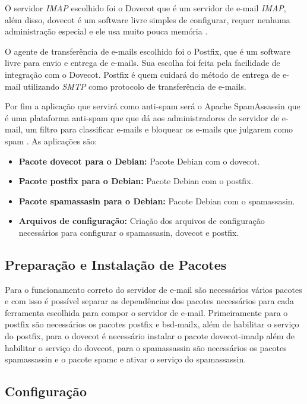 O servidor \textit{IMAP} escolhido foi o Dovecot que é um servidor de e-mail
\textit{IMAP}, além disso, dovecot é um software livre simples de configurar, requer nenhuma
administração especial e ele usa muito pouca memória \cite{dovecot}. 

O agente de transferência de e-mails escolhido foi o Postfix, que é um software
livre para envio e entrega de e-mails. Sua escolha foi feita pela facilidade de
integração com o Dovecot. Postfix é quem cuidará do método de entrega de e-mail
utilizando \textit{SMTP} como protocolo de transferência de e-mails. 

Por fim a aplicação que servirá como anti-spam será o Apache SpamAssassin que 
é uma plataforma anti-spam que que dá aos administradores de servidor de e-mail, 
um filtro para classificar e-mails e bloquear os e-mails que julgarem como spam \cite{spam}. 
As aplicações são:

\begin{itemize}
   \item \textbf{Pacote dovecot para o Debian:} Pacote Debian com o dovecot.
   \item \textbf{Pacote postfix para o Debian:} Pacote Debian com o postfix.
   \item \textbf{Pacote spamassasin para o Debian:} Pacote Debian com o spamassasin.
   \item \textbf{Arquivos de configuração:} Criação dos arquivos de configuração
   necessários para configurar o spamassasin, dovecot e postfix.
\end{itemize}

\subsection{Preparação e Instalação de Pacotes }

Para o funcionamento correto do servidor de e-mail são necessários vários pacotes
e com isso é possível separar as dependências dos pacotes necessários para cada ferramenta
escolhida para compor o servidor de e-mail. Primeiramente para o postfix são necessários
os pacotes postfix e bsd-mailx, além de habilitar o serviço do postfix, para o dovecot
é necessário instalar o pacote dovecot-imadp além de habilitar o serviço do dovecot,
para o spamassassin são necessários os pacotes spamassassin e o pacote spamc e ativar
o serviço do spamassassin.

\subsection{Configuração}

